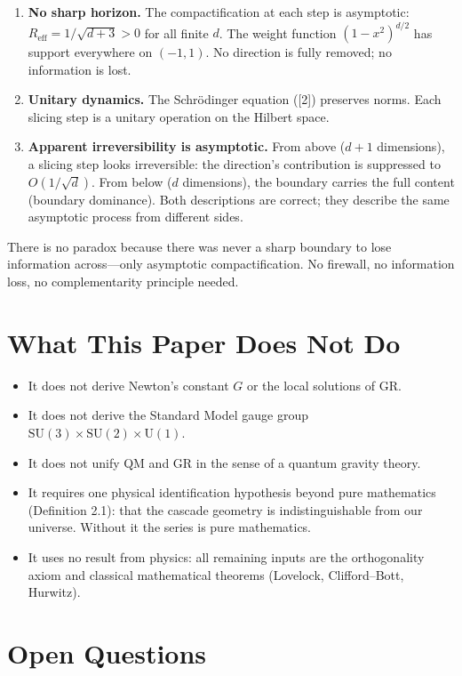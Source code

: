 \documentclass[12pt,a4paper]{article}
\begin{document}
\begin{enumerate}
\item \textbf{No sharp horizon.} The compactification at each step is asymptotic: $R_{\text{eff}} = 1/\sqrt{d + 3} >
0$ for all finite $d$. The weight function $(1 - x^2)^{d/2}$ has support everywhere on $(-1, 1)$.
No direction is fully removed; no information is lost.
\item \textbf{Unitary dynamics.} The Schr\"odinger equation ([2]) preserves norms. Each slicing step
is a unitary operation on the Hilbert space.
\item \textbf{Apparent irreversibility is asymptotic.} From above ($d + 1$ dimensions), a slicing step
looks irreversible: the direction's contribution is suppressed to $O(1/\sqrt{d})$. From below
($d$ dimensions), the boundary carries the full content (boundary dominance). Both
descriptions are correct; they describe the same asymptotic process from different
sides.
\end{enumerate}

There is no paradox because there was never a sharp boundary to lose information
across---only asymptotic compactification. No firewall, no information loss, no complementarity principle needed.

\section{What This Paper Does Not Do}

\begin{itemize}
\item It does not derive Newton's constant $G$ or the local solutions of GR.
\item It does not derive the Standard Model gauge group $\text{SU}(3) \times \text{SU}(2) \times \text{U}(1)$.
\item It does not unify QM and GR in the sense of a quantum gravity theory.
\item It requires one physical identification hypothesis beyond pure mathematics (Definition 2.1): that the cascade geometry is indistinguishable from our universe. Without
it the series is pure mathematics.
\item It uses no result from physics: all remaining inputs are the orthogonality axiom and
classical mathematical theorems (Lovelock, Clifford--Bott, Hurwitz).
\end{itemize}

\section{Open Questions}
\end{document}
